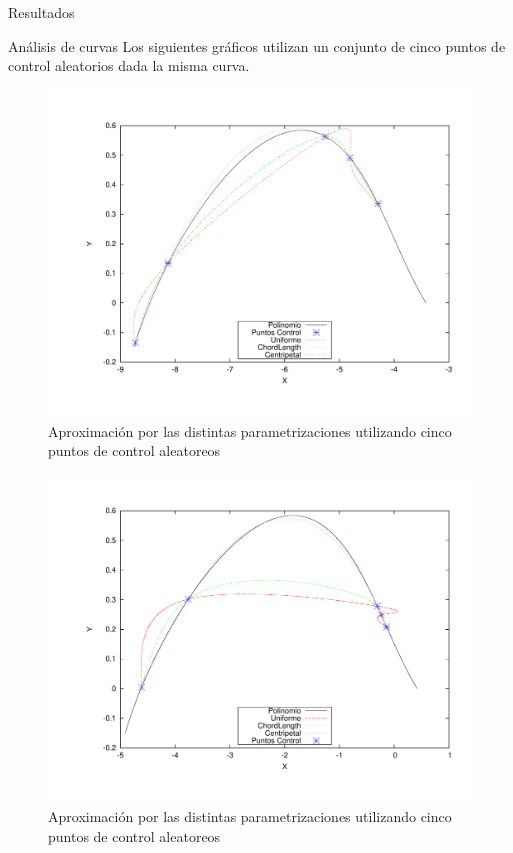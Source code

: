 \begin{section}{Resultados}
\begin{subsection}{Análisis de curvas}
		Los siguientes gráficos utilizan un conjunto de cinco puntos de control aleatorios dada la misma curva.
				
		\begin{figure}[H]
		  \centering
			\includegraphics[width=14cm]{graficos/5p.pdf}
		  \caption{Aproximación por las distintas parametrizaciones utilizando cinco puntos de control aleatoreos}
		  \label{fig:5p}
		\end{figure}
		
		\VSP
		
		\begin{figure}[H]
		  \centering
			\includegraphics[width=14cm]{graficos/5p_r.pdf}
		  \caption{Aproximación por las distintas parametrizaciones utilizando cinco puntos de control aleatoreos}
		  \label{fig:5p_r}
		\end{figure}
		

\end{subsection}
\end{section}
